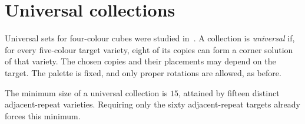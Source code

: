 \section{Universal collections}\label{sec:universal}
Universal sets for four-colour cubes were studied in~\cite[Section~6]{BES}.
A collection is \emph{universal} if, for every five-colour target variety,
eight of its copies can form a corner solution of that variety. The chosen
copies and their placements may depend on the target. The palette is fixed,
and only proper rotations are allowed, as before.

\begin{theorem}\label{thm:universal}
The minimum size of a universal collection is $15$, attained by fifteen
distinct adjacent-repeat varieties. Requiring only the sixty adjacent-repeat
targets already forces this minimum.
\end{theorem}
